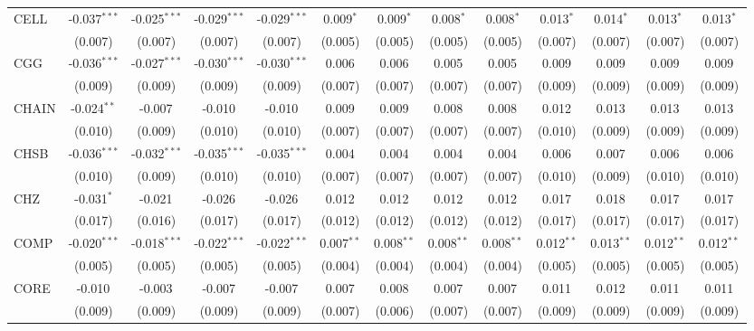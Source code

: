 \begin{table}[!htbp]
\begin{tabular}{@{\extracolsep{5pt}}lcccccccccccc}
 CELL & -0.037$^{***}$ & -0.025$^{***}$ & -0.029$^{***}$ & -0.029$^{***}$ & 0.009$^{*}$ & 0.009$^{*}$ & 0.008$^{*}$ & 0.008$^{*}$ & 0.013$^{*}$ & 0.014$^{*}$ & 0.013$^{*}$ & 0.013$^{*}$ \\
  & (0.007) & (0.007) & (0.007) & (0.007) & (0.005) & (0.005) & (0.005) & (0.005) & (0.007) & (0.007) & (0.007) & (0.007) \\
 CGG & -0.036$^{***}$ & -0.027$^{***}$ & -0.030$^{***}$ & -0.030$^{***}$ & 0.006$^{}$ & 0.006$^{}$ & 0.005$^{}$ & 0.005$^{}$ & 0.009$^{}$ & 0.009$^{}$ & 0.009$^{}$ & 0.009$^{}$ \\
  & (0.009) & (0.009) & (0.009) & (0.009) & (0.007) & (0.007) & (0.007) & (0.007) & (0.009) & (0.009) & (0.009) & (0.009) \\
 CHAIN & -0.024$^{**}$ & -0.007$^{}$ & -0.010$^{}$ & -0.010$^{}$ & 0.009$^{}$ & 0.009$^{}$ & 0.008$^{}$ & 0.008$^{}$ & 0.012$^{}$ & 0.013$^{}$ & 0.013$^{}$ & 0.013$^{}$ \\
  & (0.010) & (0.009) & (0.010) & (0.010) & (0.007) & (0.007) & (0.007) & (0.007) & (0.010) & (0.009) & (0.009) & (0.009) \\
 CHSB & -0.036$^{***}$ & -0.032$^{***}$ & -0.035$^{***}$ & -0.035$^{***}$ & 0.004$^{}$ & 0.004$^{}$ & 0.004$^{}$ & 0.004$^{}$ & 0.006$^{}$ & 0.007$^{}$ & 0.006$^{}$ & 0.006$^{}$ \\
  & (0.010) & (0.009) & (0.010) & (0.010) & (0.007) & (0.007) & (0.007) & (0.007) & (0.010) & (0.009) & (0.010) & (0.010) \\
 CHZ & -0.031$^{*}$ & -0.021$^{}$ & -0.026$^{}$ & -0.026$^{}$ & 0.012$^{}$ & 0.012$^{}$ & 0.012$^{}$ & 0.012$^{}$ & 0.017$^{}$ & 0.018$^{}$ & 0.017$^{}$ & 0.017$^{}$ \\
  & (0.017) & (0.016) & (0.017) & (0.017) & (0.012) & (0.012) & (0.012) & (0.012) & (0.017) & (0.017) & (0.017) & (0.017) \\
 COMP & -0.020$^{***}$ & -0.018$^{***}$ & -0.022$^{***}$ & -0.022$^{***}$ & 0.007$^{**}$ & 0.008$^{**}$ & 0.008$^{**}$ & 0.008$^{**}$ & 0.012$^{**}$ & 0.013$^{**}$ & 0.012$^{**}$ & 0.012$^{**}$ \\
  & (0.005) & (0.005) & (0.005) & (0.005) & (0.004) & (0.004) & (0.004) & (0.004) & (0.005) & (0.005) & (0.005) & (0.005) \\
 CORE & -0.010$^{}$ & -0.003$^{}$ & -0.007$^{}$ & -0.007$^{}$ & 0.007$^{}$ & 0.008$^{}$ & 0.007$^{}$ & 0.007$^{}$ & 0.011$^{}$ & 0.012$^{}$ & 0.011$^{}$ & 0.011$^{}$ \\
  & (0.009) & (0.009) & (0.009) & (0.009) & (0.007) & (0.006) & (0.007) & (0.007) & (0.009) & (0.009) & (0.009) & (0.009) \\

\end{tabular}
\end{table}
